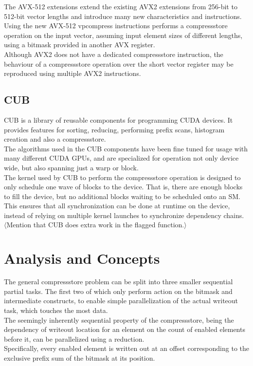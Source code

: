 \documentclass{tudscrreprt}
\newcommand{\markr}[1]{\textcolor{review}{$\langle$#1$\rangle$}}
\begin{document}
			The AVX-512 extensions extend the existing AVX2 extensions from 256-bit to 512-bit vector lengths and introduce many new characteristics and instructions. Using the new AVX-512 vpcompress instructions performs a compressstore operation on the input vector, assuming input element sizes of different lengths, using a bitmask provided in another AVX register. \\
			
			Although AVX2 does not have a dedicated compressstore instruction, the behaviour of a compressstore operation over the short vector register may be reproduced using multiple AVX2 instructions. \\
		
		\section{CUB}
			CUB is a library of reusable components for programming CUDA devices. It provides features for sorting, reducing, performing prefix scans, histogram creation and also a compressstore. \\
			The algorithms used in the CUB components have been fine tuned for usage with many different CUDA GPUs, and are specialized for operation not only device wide, but also spanning just a warp or block. \\
			
			The kernel used by CUB to perform the compressstore operation is designed to only schedule one wave of blocks to the device. That is, there are enough blocks to fill the device, but no additional blocks waiting to be scheduled onto an SM. This ensures that all synchronization can be done at runtime on the device, instead of relying on multiple kernel launches to synchronize dependency chains. \\
			
			\markr{Mention that CUB does extra work in the flagged function.}
		
	\chapter{Analysis and Concepts}
		The general compressstore problem can be split into three smaller sequential partial tasks. The first two of which only perform action on the bitmask and intermediate constructs, to enable simple parallelization of the actual writeout task, which touches the most data. \\
		
		The seemingly inherently sequential property of the compressstore, being the dependency of writeout location for an element on the count of enabled elements before it, can be parallelized using a reduction. \\
		Specifically, every enabled element is written out at an offset corresponding to the exclusive prefix sum of the bitmask at its position. \\
		
\end{document}
